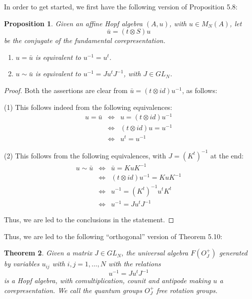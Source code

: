 \documentclass[12pt]{amsbook}
\newtheorem{theorem}{Theorem}[chapter]
\newtheorem{proposition}[theorem]{Proposition}
\begin{document}
In order to get started, we first have the following version of Proposition 5.8:

\begin{proposition}
Given an affine Hopf algebra $(A,u)$, with $u\in M_N(A)$, let
$$\bar{u}=(t\otimes S)u$$
be the conjugate of the fundamental corepresentation.
\begin{enumerate}
\item $u=\bar{u}$ is equivalent to $u^{-1}=u^t$.

\item $u\sim\bar{u}$ is equivalent to $u^{-1}=Ju^tJ^{-1}$, with $J\in GL_N$.
\end{enumerate} 
\end{proposition}

\begin{proof}
Both the assertions are clear from $\bar{u}=(t\otimes id)u^{-1}$, as follows:

\medskip

(1) This follows indeed from the following equivalences:
\begin{eqnarray*}
u=\bar{u}
&\iff&u=(t\otimes id)u^{-1}\\
&\iff&(t\otimes id)u=u^{-1}\\
&\iff&u^t=u^{-1}
\end{eqnarray*}

(2) This follows from the following equivalences, with $J=(K^t)^{-1}$ at the end:
\begin{eqnarray*}
u\sim\bar{u}
&\iff&\bar{u}=KuK^{-1}\\
&\iff&(t\otimes id)u^{-1}=KuK^{-1}\\
&\iff&u^{-1}=(K^t)^{-1}u^tK^t\\
&\iff&u^{-1}=Ju^tJ^{-1}
\end{eqnarray*}

Thus, we are led to the conclusions in the statement.
\end{proof}

Thus, we are led to the following ``orthogonal'' version of Theorem 5.10:

\begin{theorem}
Given a matrix $J\in GL_N$, the universal algebra $F(O_J^+)$ generated by variables $u_{ij}$ with $i,j=1,\ldots,N$ with the relations
$$u^{-1}=Ju^tJ^{-1}$$
is a Hopf algebra, with comultiplication, counit and antipode making $u$ a corepresentation. We call the quantum groups $O_J^+$ free rotation groups.
\end{theorem}
\end{document}
